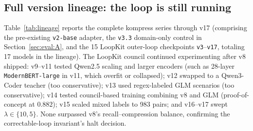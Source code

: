 \subsection{Full version lineage: the loop is still running}
\label{sec:eval:lineage}

Table~\ref{tab:lineage} reports the complete kompress series through v17
(comprising the pre-existing \texttt{v2-base} adapter, the \texttt{v3.3}
domain-only control in Section~\ref{sec:eval:A}, and the 15 LoopKit outer-loop
checkpoints \texttt{v3}--\texttt{v17}, totaling 17 models in the lineage).
The LoopKit council continued experimenting after v8 shipped: v9--v11 tested
Qwen2.5 scaling and larger encoders (such as 28-layer
\texttt{ModernBERT-large} in v11, which overfit or collapsed); v12 swapped
to a Qwen3-Coder teacher (too conservative); v13 used regex-labeled GLM
scenarios (too conservative); v14 tested council-based training combining v8
and GLM (proof-of-concept at $0.882$); v15 scaled mixed labels to 983 pairs;
and v16--v17 swept $\lambda\in\{10,5\}$. None surpassed v8's recall--compression
balance, confirming the correctable-loop invariant's halt decision.

